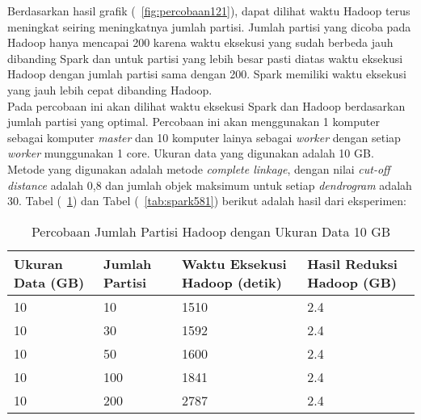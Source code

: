 Berdasarkan hasil grafik (~\ref{fig:percobaan121}), dapat dilihat waktu Hadoop terus meningkat seiring meningkatnya jumlah partisi. Jumlah partisi yang dicoba pada Hadoop hanya mencapai 200 karena waktu eksekusi yang sudah berbeda jauh dibanding Spark dan untuk partisi yang lebih besar pasti diatas waktu eksekusi Hadoop dengan jumlah partisi sama dengan 200. Spark memiliki waktu eksekusi yang jauh lebih cepat dibanding Hadoop. \\



















Pada percobaan ini akan dilihat waktu eksekusi Spark dan Hadoop berdasarkan jumlah partisi yang optimal. Percobaan ini akan menggunakan 1 komputer sebagai komputer \textit{master} dan 10 komputer lainya sebagai \textit{worker} dengan setiap \textit{worker} munggunakan 1 core. Ukuran data yang digunakan adalah 10 GB. Metode yang digunakan adalah metode \textit{complete linkage}, dengan nilai \textit{cut-off distance} adalah 0,8 dan jumlah objek maksimum untuk setiap \textit{dendrogram} adalah 30. Tabel (~\ref{tab:spark571}) dan Tabel (~\ref{tab:spark581}) berikut adalah hasil dari eksperimen:


\begin{table}[H] 
	\centering 
	\caption{Percobaan Jumlah Partisi Hadoop dengan Ukuran Data 10 GB}
	\label{tab:spark571}
	\begin{tabular}{|p{3cm}|p{3cm}|p{4cm}|p{4cm}|}
\hline
Ukuran Data (GB) & Jumlah Partisi &  Waktu Eksekusi Hadoop (detik) & Hasil Reduksi Hadoop (GB)\\
\hline
10 & 10 & 1510  & 2.4  \\
\hline
10 & 30 & 1592  & 2.4  \\
\hline
10 & 50 & 1600  & 2.4  \\
\hline
10 & 100 & 1841  & 2.4  \\
\hline
10 & 200 & 2787  & 2.4  \\
\hline

\hline

	\end{tabular} 
\end{table}




